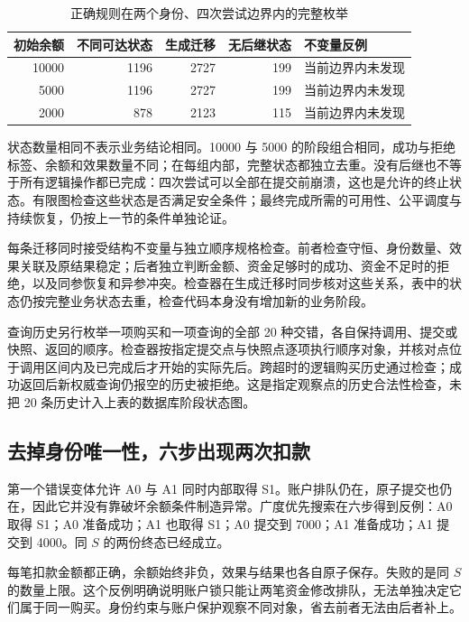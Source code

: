 \begin{table}[htbp]
\centering\small
\begin{tabularx}{\linewidth}{@{}rrrrX@{}}
\toprule
初始余额 & 不同可达状态 & 生成迁移 & 无后继状态 & 不变量反例\\
\midrule
10000 & 1196 & 2727 & 199 & 当前边界内未发现\\
5000 & 1196 & 2727 & 199 & 当前边界内未发现\\
2000 & 878 & 2123 & 115 & 当前边界内未发现\\
\bottomrule
\end{tabularx}
\caption{正确规则在两个身份、四次尝试边界内的完整枚举}
\end{table}

状态数量相同不表示业务结论相同。10000 与 5000 的阶段组合相同，成功与拒绝标签、余额和效果数量不同；在每组内部，完整状态都独立去重。没有后继也不等于所有逻辑操作都已完成：四次尝试可以全部在提交前崩溃，这也是允许的终止状态。有限图检查这些状态是否满足安全条件；最终完成所需的可用性、公平调度与持续恢复，仍按上一节的条件单独论证。

每条迁移同时接受结构不变量与独立顺序规格检查。前者检查守恒、身份数量、效果关联及原结果稳定；后者独立判断金额、资金足够时的成功、资金不足时的拒绝，以及同参恢复和异参冲突。检查器在生成迁移时同步核对这些关系，表中的状态仍按完整业务状态去重，检查代码本身没有增加新的业务阶段。

查询历史另行枚举一项购买和一项查询的全部 20 种交错，各自保持调用、提交或快照、返回的顺序。检查器按指定提交点与快照点逐项执行顺序对象，并核对点位于调用区间内及已完成后才开始的实际先后。跨超时的逻辑购买历史通过检查；成功返回后新权威查询仍报空的历史被拒绝。这是指定观察点的历史合法性检查，未把 20 条历史计入上表的数据库阶段状态图。

\subsection*{去掉身份唯一性，六步出现两次扣款}

第一个错误变体允许 A0 与 A1 同时内部取得 S1。账户排队仍在，原子提交也仍在，因此它并没有靠破坏余额条件制造异常。广度优先搜索在六步得到反例：A0 取得 S1；A0 准备成功；A1 也取得 S1；A0 提交到 7000；A1 准备成功；A1 提交到 4000。同 \(S\) 的两份终态已经成立。



每笔扣款金额都正确，余额始终非负，效果与结果也各自原子保存。失败的是同 \(S\) 的数量上限。这个反例明确说明账户锁只能让两笔资金修改排队，无法单独决定它们属于同一购买。身份约束与账户保护观察不同对象，省去前者无法由后者补上。

